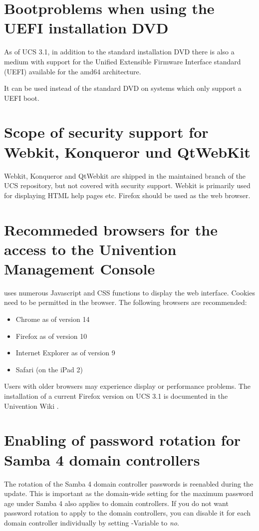 \section{Bootproblems when using the UEFI installation DVD}
As of UCS 3.1, in addition to the standard installation DVD there is
also a medium with support for the Unified Extensible Firmware
Interface standard (UEFI) available for the amd64 architecture.

It can be used instead of the standard DVD on systems which only
support a UEFI boot.

\section{Scope of security support for Webkit, Konqueror und QtWebKit}
Webkit, Konqueror and QtWebkit are shipped in the maintained branch of
the UCS repository, but not covered with security support. Webkit is
primarily used for displaying HTML help pages etc. Firefox should be
used as the web browser.

\section{Recommeded browsers for the access to the Univention Management Console}

\ucsUMC{} uses numerous Javascript and CSS functions to display the
web interface. Cookies need to be permitted in the browser.
The following browsers are recommended:

\begin{itemize}
\item Chrome as of version 14
\item Firefox as of version 10
\item Internet Explorer as of version 9
\item Safari (on the iPad 2)
\end{itemize}

Users with older browsers may experience display or performance
problems. The installation of a current Firefox version on UCS 3.1 is
documented in the Univention Wiki \cite{ucd-firefox7}.

\section{Enabling of password rotation for Samba 4 domain controllers}

The rotation of the Samba 4 domain controller passwords is reenabled
during the update. This is important as the domain-wide setting for
the maximum password age under Samba 4 also applies to domain
controllers. If you do not want password rotation to apply to the
domain controllers, you can disable it for each domain controller
individually by setting \ucsUCR{}-Variable  to \emph{no}.

